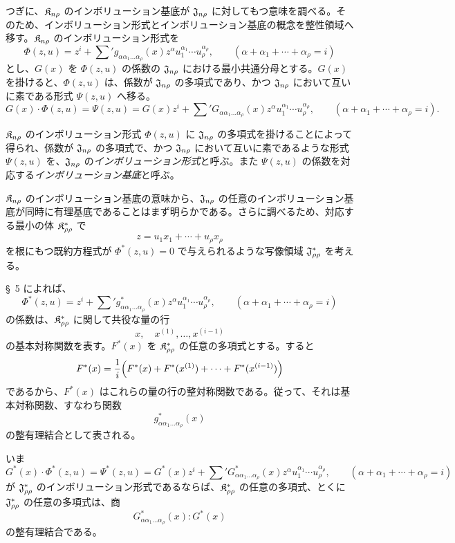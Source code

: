 \documentclass[11pt]{jlreq}
\begin{document}
つぎに、$\mathfrak{K}_{n\rho}$ のインボリューション基底が $\mathfrak{J}_{n\rho}$ に対してもつ意味を調べる。そのため、インボリューション形式とインボリューション基底の概念を整性領域へ移す。$\mathfrak{K}_{n\rho}$ のインボリューション形式を
\[
  \Phi(z,u)=z^i+\sum{}' g_{\alpha\alpha_1\ldots\alpha_\rho}(x)
  z^\alpha u_1^{\alpha_1}\cdots u_\rho^{\alpha_\rho},
  \qquad
  (\alpha+\alpha_1+\cdots+\alpha_\rho=i)
\]
とし、$G(x)$ を $\Phi(z,u)$ の係数の $\mathfrak{J}_{n\rho}$ における最小共通分母とする。$G(x)$ を掛けると、$\Phi(z,u)$ は、係数が $\mathfrak{J}_{n\rho}$ の多項式であり、かつ $\mathfrak{J}_{n\rho}$ において互いに素である形式 $\Psi(z,u)$ へ移る。
\[
  G(x)\cdot\Phi(z,u)=\Psi(z,u)
  =G(x)z^i+
  \sum{}' G_{\alpha\alpha_1\ldots\alpha_\rho}(x)
  z^\alpha u_1^{\alpha_1}\cdots u_\rho^{\alpha_\rho},
  \qquad
  (\alpha+\alpha_1+\cdots+\alpha_\rho=i).
\]

$\mathfrak{K}_{n\rho}$ のインボリューション形式 $\Phi(z,u)$ に $\mathfrak{J}_{n\rho}$ の多項式を掛けることによって得られ、係数が $\mathfrak{J}_{n\rho}$ の多項式で、かつ $\mathfrak{J}_{n\rho}$ において互いに素であるような形式 $\Psi(z,u)$ を、$\mathfrak{J}_{n\rho}$ の\emph{インボリューション形式}と呼ぶ。また $\Psi(z,u)$ の係数を対応する\emph{インボリューション基底}と呼ぶ。

$\mathfrak{K}_{n\rho}$ のインボリューション基底の意味から、$\mathfrak{J}_{n\rho}$ の任意のインボリューション基底が同時に有理基底であることはまず明らかである。さらに調べるため、対応する最小の体 $\mathfrak{K}^*_{\rho\rho}$ で
\[
  z=u_1x_1+\cdots+u_\rho x_\rho
\]
を根にもつ既約方程式が $\Phi^*(z,u)=0$ で与えられるような写像領域 $\mathfrak{J}^*_{\rho\rho}$ を考える。

\S\ 5 によれば、
\[
  \Phi^*(z,u)=z^i+\sum{}' g^*_{\alpha\alpha_1\ldots\alpha_\rho}(x)
  z^\alpha u_1^{\alpha_1}\cdots u_\rho^{\alpha_\rho},
  \qquad
  (\alpha+\alpha_1+\cdots+\alpha_\rho=i)
\]
の係数は、$\mathfrak{K}^*_{\rho\rho}$ に関して共役な量の行
\[
  x,\quad x^{(1)},\ldots,x^{(i-1)}
\]
の基本対称関数を表す。$F^*(x)$ を $\mathfrak{K}^*_{\rho\rho}$ の任意の多項式とする。すると
\[
  F^*(x)=\frac1i\Bigl(F^*(x)+F^*(x^{(1)})+
  \cdots+F^*(x^{(i-1)})\Bigr)
\]
であるから、$F^*(x)$ はこれらの量の行の整対称関数である。従って、それは基本対称関数、すなわち関数
\[
  g^*_{\alpha\alpha_1\ldots\alpha_\rho}(x)
\]
の整有理結合として表される。

いま
\[
  G^*(x)\cdot\Phi^*(z,u)=\Psi^*(z,u)
  =G^*(x)z^i+
  \sum{}'G^*_{\alpha\alpha_1\ldots\alpha_\rho}(x)
  z^\alpha u_1^{\alpha_1}\cdots u_\rho^{\alpha_\rho},
  \qquad
  (\alpha+\alpha_1+\cdots+\alpha_\rho=i)
\]
が $\mathfrak{J}^*_{\rho\rho}$ のインボリューション形式であるならば、$\mathfrak{K}^*_{\rho\rho}$ の任意の多項式、とくに $\mathfrak{J}^*_{\rho\rho}$ の任意の多項式は、商
\[
  G^*_{\alpha\alpha_1\ldots\alpha_\rho}(x):G^*(x)
\]
の整有理結合である。
\end{document}
